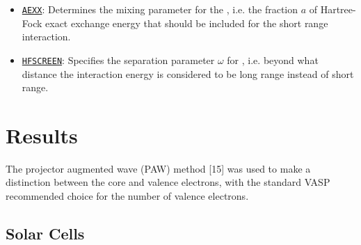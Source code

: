 \begin{refsection}
\begin{itemize}
 \label{appendix:sec-AEXX} 
\item \href{https://cms.mpi.univie.ac.at/wiki/index.php/AEXX}{\texttt{AEXX}}: 
Determines the mixing parameter for the , 
i.e. the fraction $a$ of Hartree-Fock exact exchange energy that should be 
included for the short range interaction.

 \label{appendix:sec-HFSCREEN} 
\item \href{https://cms.mpi.univie.ac.at/wiki/index.php/HFSCREEN}{\texttt{HFSCREEN}}: 
Specifies the separation parameter $\omega$ for 
, i.e. beyond what distance the 
interaction energy is considered to be long range instead of short range.

\end{itemize} 

\section{Results} \label{appendix:sec-results} 

The projector augmented wave (PAW) method [15] was used to make a 
distinction between the core and valence electrons, with the standard VASP 
recommended choice for the number of valence electrons.  

\subsection{Solar Cells} \label{appendix:sec-solar} 
 

\end{refsection}
